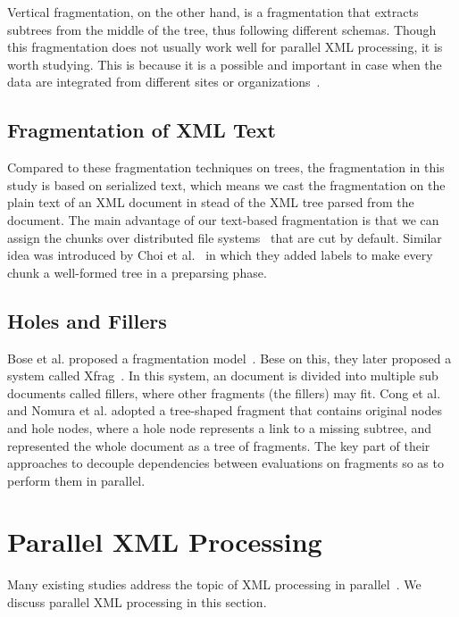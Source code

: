 Vertical fragmentation, on the other hand, is a fragmentation that extracts
subtrees from the middle of the tree, thus following different schemas. Though
this fragmentation does not usually work well for parallel XML processing, it is
worth studying. This is because it is a possible and  important in case when the
data are integrated from different sites or organizations~\cite{CFKL12,KlOD10}.

\subsection{Fragmentation of XML Text}

Compared to these fragmentation techniques on trees, the fragmentation in this
study is based on serialized text, which means we cast the fragmentation on the
plain text of an XML document in stead of the XML tree parsed from the document.
The main advantage of our text-based fragmentation is that we can assign the
chunks over distributed file systems~\cite{dfs} that are cut by default. Similar
idea was introduced by Choi et al.~\cite{ChLL14} in which they added labels to
make every chunk a well-formed tree in a preparsing phase.

\subsection{Holes and Fillers}

Bose et al. proposed a fragmentation model~\cite{bose2003query}. Bese on this,
they later proposed a system called Xfrag~\cite{bose2005xfrag}. In this system,
an document is divided into multiple sub documents called fillers, where other
fragments (the fillers) may fit.  Cong et al.~\cite{CFKL12} and Nomura et al.
\cite{NEMH07} adopted a tree-shaped fragment that contains original nodes and
hole nodes, where a hole node represents a link to a missing subtree, and
represented the whole document as a tree of fragments. The key part of their
approaches to decouple dependencies between evaluations on fragments so as to
perform them in parallel. 



\section{Parallel XML Processing}
\label{sec:paralleleval}

Many existing studies address the topic of XML processing in
parallel~\cite{BoLS09,PaZC08,LuGa08,Mats09,SAFu05}. We discuss parallel XML
processing in this section.

